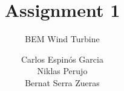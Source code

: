 \documentclass[whitelogo]{tudelft-report}
\begin{document}
\frontmatter


\title[tudelft-white]{Assignment 1}
\subtitle[tudelft-black]{BEM Wind Turbine}
\author[tudelft-white]{ Carlos Espinós Garcia \\
    Niklas Perujo \\  
    Bernat Serra Zueras }
\makecover[split]


%

% 

\tableofcontents

\mainmatter











\appendix

%


\end{document}
